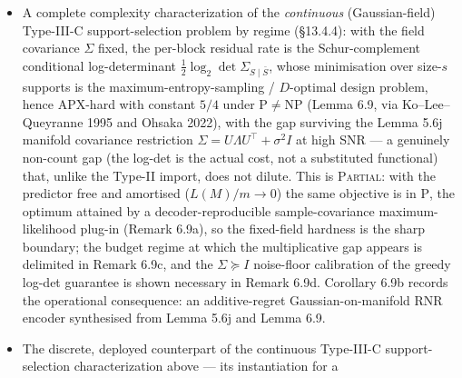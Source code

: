 \documentclass[
]{article}
\begin{document}
\begin{itemize}
  constant $\gamma_{\mathrm{SGP}} = 8569/8568$ inherited from
  Charikar et al.\ (2005, Theorem 1) via the symbol-count bijection
  (Theorem 6.8), and an extension of the same APX-hardness constant
  to the \emph{bit-cost} objective $L^{\mathrm{bit}} =
  L_{\mathrm{sym}} \cdot \lceil \log_2(|\Sigma|+K) \rceil$ within the
  Charikar normal-form grammar class on Berman-Karpinski-hard
  instances (Lemma 6.8b), via a ratio-preserving reduction exploiting
  monotonicity of $L^{\mathrm{bit}}$ in the vertex-cover size
  $|\sigma|$. The 8569/8568 constant derives from the
  Berman-Karpinski (1999) bound on Vertex-Cover-3 inapproximability
  propagated through the $15|V|+3|E|+k$ encoding overhead. The
  fixed-byte-alphabet case requires a fresh gap-preserving
  construction and we do not claim a specific constant for it;
  unrestricted bit-cost APX-hardness over all (non-Charikar-format)
  grammars and unrestricted-predictor joint hardness remain open.
\item
  A complete complexity characterization of the \emph{continuous}
  (Gaussian-field) Type-III-C support-selection problem by regime
  (§13.4.4): with the field covariance $\Sigma$ fixed, the per-block
  residual rate is the Schur-complement conditional log-determinant
  $\tfrac12\log_2\det\Sigma_{S\mid\bar S}$, whose minimisation over
  size-$s$ supports is the maximum-entropy-sampling / $D$-optimal
  design problem, hence APX-hard with constant $5/4$ under
  $\mathrm{P}\neq\mathrm{NP}$ (Lemma 6.9, via Ko--Lee--Queyranne 1995
  and Ohsaka 2022), with the gap surviving the Lemma 5.6j manifold
  covariance restriction $\Sigma=U\Lambda U^\top+\sigma^2 I$ at high
  SNR --- a genuinely non-count gap (the log-det is the actual cost,
  not a substituted functional) that, unlike the Type-II import,
  does not dilute. This is \textsc{Partial}: with the predictor free
  and amortised ($L(M)/m\to0$) the same objective is in $\mathrm{P}$,
  the optimum attained by a decoder-reproducible sample-covariance
  maximum-likelihood plug-in (Remark 6.9a), so the fixed-field
  hardness is the sharp boundary; the budget regime at which the
  multiplicative gap appears is delimited in Remark 6.9c, and the
  $\Sigma\succeq I$ noise-floor calibration of the greedy log-det
  guarantee is shown necessary in Remark 6.9d. Corollary 6.9b records
  the operational consequence: an additive-regret Gaussian-on-manifold
  RNR encoder synthesised from Lemma 5.6j and Lemma 6.9.
\item
  The discrete, deployed counterpart of the continuous Type-III-C
  support-selection characterization above --- its instantiation for a

\end{itemize}
\end{document}
